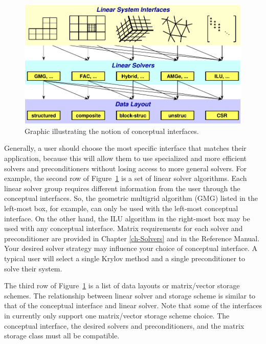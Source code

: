 \begin{figure}
\centering
\includegraphics[width=5in]{fig_concep_iface}
\caption{%
Graphic illustrating the notion of conceptual interfaces.}
\label{fig-conceptual-interface}
\end{figure}

Generally, a user should choose the most specific interface that
matches their application, because this will allow them to use
specialized and more efficient solvers and preconditioners without
losing access to more general solvers.  For example, the second row of
Figure~\ref{fig-conceptual-interface} is a set of linear solver
algorithms.  Each linear solver group requires different information
from the user through the conceptual interfaces.  So, the geometric
multigrid algorithm (GMG) listed in the left-most box, for example,
can only be used with the left-most conceptual interface.  On the
other hand, the ILU algorithm in the right-most box may be used with
any conceptual interface.  Matrix requirements for each solver and
preconditioner are provided in Chapter \ref{ch-Solvers} and in the
\hypre{} Reference Manual.  Your desired solver strategy may influence
your choice of conceptual interface.  A typical user will select a
single Krylov method and a single preconditioner to solve their system.


The third row of Figure~\ref{fig-conceptual-interface} is a list of
data layouts or matrix/vector storage schemes.  The relationship
between linear solver and storage scheme is similar to that of the
conceptual interface and linear solver.  Note that some of the
interfaces in \hypre{} currently only support one matrix/vector
storage scheme choice.  The conceptual interface, the desired solvers
and preconditioners, and the matrix storage class must all be
compatible.



